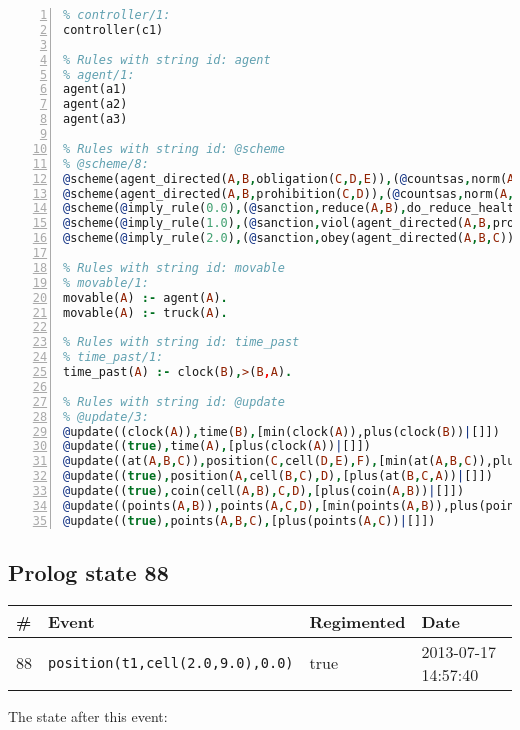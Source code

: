 \documentclass[11pt]{article}\usepackage[utf8]{inputenc}\usepackage{geometry}
\begin{document}
\begin{lstlisting}[language=Prolog, numbers=left]
% Rules with string id: controller
% controller/1:
controller(c1)

% Rules with string id: agent
% agent/1:
agent(a1)
agent(a2)
agent(a3)

% Rules with string id: @scheme
% @scheme/8:
@scheme(agent_directed(A,B,obligation(C,D,E)),(@countsas,norm(A,B,F,obligation(C,D,E)),F),false,(listTrue(C)),(time_past(D)),false,[plus(viol(agent_directed(A,B,obligation(C,D,E))))|[]],[plus(obey(agent_directed(A,B,obligation(C,D,E))))|[]])
@scheme(agent_directed(A,B,prohibition(C,D)),(@countsas,norm(A,B,E,prohibition(C,D)),E),(listTrue(C)),false,(false),false,[plus(viol(agent_directed(A,B,prohibition(C,D))))|[]],[plus(obey(agent_directed(A,B,prohibition(C,D))))|[]])
@scheme(@imply_rule(0.0),(@sanction,reduce(A,B),do_reduce_health(A,B),notifyAgent(A,changed(status))),true,false,false,false,[min(reduce(A,B))|[]],[])
@scheme(@imply_rule(1.0),(@sanction,viol(agent_directed(A,B,prohibition(C,D))),do_sanction(D)),true,false,false,false,[min(viol(agent_directed(A,B,prohibition(C,D))))|[]],[])
@scheme(@imply_rule(2.0),(@sanction,obey(agent_directed(A,B,C))),true,false,false,false,[min(obey(agent_directed(A,B,C)))|[]],[])

% Rules with string id: movable
% movable/1:
movable(A) :- agent(A).
movable(A) :- truck(A).

% Rules with string id: time_past
% time_past/1:
time_past(A) :- clock(B),>(B,A).

% Rules with string id: @update
% @update/3:
@update((clock(A)),time(B),[min(clock(A)),plus(clock(B))|[]])
@update((true),time(A),[plus(clock(A))|[]])
@update((at(A,B,C)),position(C,cell(D,E),F),[min(at(A,B,C)),plus(at(D,E,C))|[]])
@update((true),position(A,cell(B,C),D),[plus(at(B,C,A))|[]])
@update((true),coin(cell(A,B),C,D),[plus(coin(A,B))|[]])
@update((points(A,B)),points(A,C,D),[min(points(A,B)),plus(points(A,D))|[]])
@update((true),points(A,B,C),[plus(points(A,C))|[]])

\end{lstlisting}
\clearpage 
\subsection{Prolog state 88}
\begin{table}[ht]
\centering 
\begin{tabular}{l l l l} 
\textbf{\#} & \textbf{Event} & \textbf{Regimented} & \textbf{Date} \\ [0.5ex] 
\hline
88&\texttt{position(t1,cell(2.0,9.0),0.0)}&true&2013-07-17 14:57:40\\ [1ex] \hline\end{tabular}
\end{table}
The state after this event:
\end{document}
